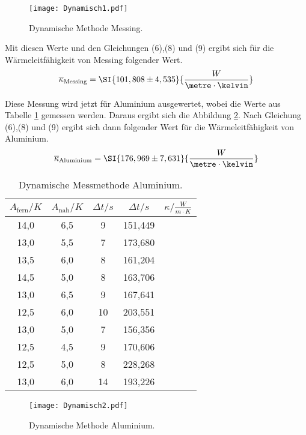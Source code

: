 \begin{figure}[H]
    \centering
    \texttt{[image: Dynamisch1.pdf]}
    \caption{Dynamische Methode Messing.}
    \label{fig:d}
\end{figure}

Mit diesen Werte und den Gleichungen (6),(8) und (9) ergibt sich für die Wärmeleitfähigkeit von Messing folgender Wert.
\begin{equation}
    \overline{\kappa}_\text{Messing} =  \SI{101,808 \pm 4,535}{\frac{W}{\metre\cdot\kelvin}} \notag
\end{equation}


Diese Messung wird jetzt für Aluminium ausgewertet, wobei die Werte aus Tabelle \ref{tab:d} gemessen werden.
Daraus ergibt sich die Abbildung \ref{fig:e}.
Nach Gleichung (6),(8) und (9) ergibt sich dann folgender Wert für die Wärmeleitfähigkeit von Aluminium.
\begin{equation}
    \overline{\kappa}_\text{Aluminium} =  \SI{176,969 \pm 7,631}{\frac{W}{\metre\cdot \kelvin}} \notag
\end{equation}

\begin{table}[H]
    \begin{center}
      \caption{Dynamische Messmethode Aluminium.}
      \label{tab:d}
      \begin{tabular}{c|c|c|c|c} 
        \textbf{$A_\text{fern} / K$ } &  \textbf{$A_\text{nah} / K$} & \textbf{$\Delta t / s$}& \textbf{$\Delta t / s$} & \textbf{$\kappa / \frac{W}{m \cdot K}$}\\
        \hline
        14,0 &6,5 &9 & 151,449 \\
        13,0 &5,5 &7 & 173,680 \\
        13,5 &6,0 &8 & 161,204 \\
        14,5 &5,0 &8 & 163,706 \\
        13,0 &6,5 &9 & 167,641 \\
        12,5 &6,0 &10 & 203,551 \\
        13,0 &5,0 &7 & 156,356 \\
        12,5 &4,5 &9 & 170,606 \\
        12,5 &5,0 &8&  228,268 \\
        13,0 &6,0 &14& 193,226 \\
      \end{tabular}
    \end{center}
\end{table}

\begin{figure}[H]
    \centering
    \texttt{[image: Dynamisch2.pdf]}
    \caption{Dynamische Methode Aluminium.}
    \label{fig:e}
\end{figure}

